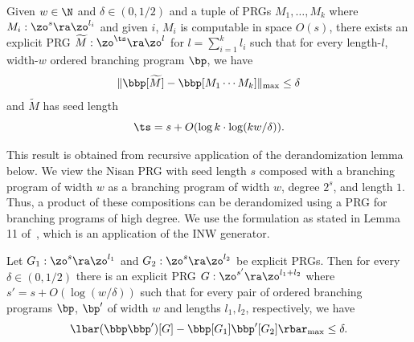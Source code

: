 \documentclass{toc}
\begin{document}
\begin{lemma}
\label{lem:pathInnerTool}
Given $w\in \N$ and $\delta \in (0,1/2)$ and a tuple of PRGs $M_1,\ldots,M_{k}$ where $M_i:\zo^{s}\ra \zo^{l_i}$ and given $i$, $M_i$ is computable in space $O(s)$, there exists an explicit PRG $\widetilde{M}:\zo^{\ts}\ra\zo^l$ for $l=\sum_{i=1}^k l_i$ such that for every length-$l$, width-$w$ ordered branching program $\bp$, we have 
\[\|\bbp[\widetilde{M}]-\bbp[M_1\cdots M_k]\|_{\max}\leq \delta\] 
and $\widetilde{M}$ has seed length
\[\ts=s+O(\log k\cdot\log(kw/\delta)).\]
\end{lemma}

This result is obtained from recursive application of the derandomization lemma below. We view the Nisan PRG with seed length $s$ composed with a branching program of width $w$ as a branching program of width $w$, degree $2^s$, and length $1$. Thus, a product of these compositions can be derandomized using a PRG for branching programs of high degree. We use the formulation as stated in Lemma 11 of~\cite{ChattopadhyayLi20}, which is an application of the 
INW generator. %
\begin{lemma}
Let $G_1:\zo^s \ra \zo^{l_1}$ and $G_2:\zo^s\ra \zo^{l_2}$ be explicit PRGs. Then for every $\delta \in (0,1/2)$ there is an explicit PRG $G:\zo^{s'}\ra \zo^{l_1+l_2}$ where $s'=s+O(\log(w/\delta))$ such that for every pair of ordered branching programs $\bp$, $\bp'$ of width $w$ and lengths $l_1,l_2$, respectively, %
we have 
$$\lbar(\bbp\bbp')[G] -\bbp[G_1]\bbp'[G_2]\rbar_{\max}\leq \delta.$$
\end{lemma}
\end{document}
